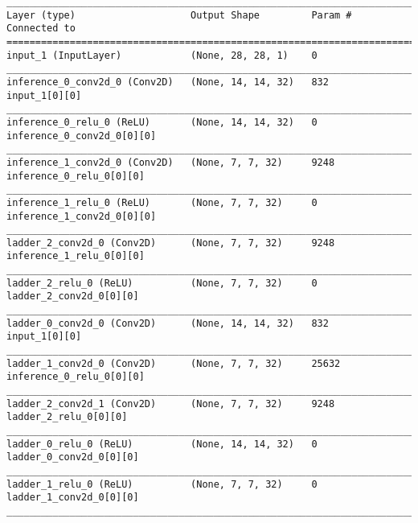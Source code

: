 \begin{lstlisting}[caption={\textsc{Mnist}-\ac{VLAE}-factor-2 Encoder},captionpos=b,basicstyle=\tiny, label={lst:sparsity-vlae-encoder-28-fm2}]
__________________________________________________________________________________________________
Layer (type)                    Output Shape         Param #     Connected to
==================================================================================================
input_1 (InputLayer)            (None, 28, 28, 1)    0
__________________________________________________________________________________________________
inference_0_conv2d_0 (Conv2D)   (None, 14, 14, 32)   832         input_1[0][0]
__________________________________________________________________________________________________
inference_0_relu_0 (ReLU)       (None, 14, 14, 32)   0           inference_0_conv2d_0[0][0]
__________________________________________________________________________________________________
inference_1_conv2d_0 (Conv2D)   (None, 7, 7, 32)     9248        inference_0_relu_0[0][0]
__________________________________________________________________________________________________
inference_1_relu_0 (ReLU)       (None, 7, 7, 32)     0           inference_1_conv2d_0[0][0]
__________________________________________________________________________________________________
ladder_2_conv2d_0 (Conv2D)      (None, 7, 7, 32)     9248        inference_1_relu_0[0][0]
__________________________________________________________________________________________________
ladder_2_relu_0 (ReLU)          (None, 7, 7, 32)     0           ladder_2_conv2d_0[0][0]
__________________________________________________________________________________________________
ladder_0_conv2d_0 (Conv2D)      (None, 14, 14, 32)   832         input_1[0][0]
__________________________________________________________________________________________________
ladder_1_conv2d_0 (Conv2D)      (None, 7, 7, 32)     25632       inference_0_relu_0[0][0]
__________________________________________________________________________________________________
ladder_2_conv2d_1 (Conv2D)      (None, 7, 7, 32)     9248        ladder_2_relu_0[0][0]
__________________________________________________________________________________________________
ladder_0_relu_0 (ReLU)          (None, 14, 14, 32)   0           ladder_0_conv2d_0[0][0]
__________________________________________________________________________________________________
ladder_1_relu_0 (ReLU)          (None, 7, 7, 32)     0           ladder_1_conv2d_0[0][0]
__________________________________________________________________________________________________

\end{lstlisting}
